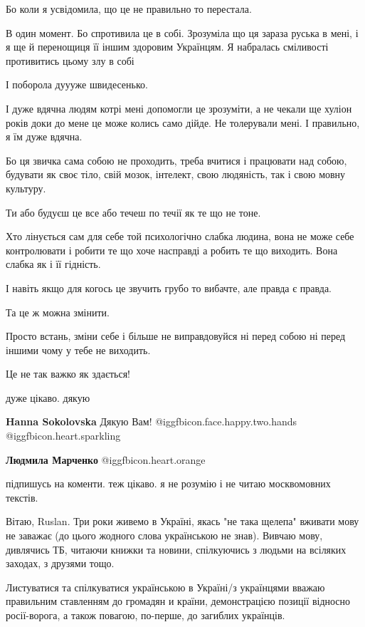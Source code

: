 \begin{itemize}
Бо коли я усвідомила, що це не правильно то перестала.

В один момент. Бо спротивила це в собі. Зрозуміла що ця зараза руська в мені, і
я ще й перенощиця її іншим здоровим Українцям. Я набралась сміливості
противитись цьому злу в собі

І поборола дуууже швидесенько.

І дуже вдячна людям котрі мені допомогли це зрозуміти, а не чекали ще хуліон
років доки до мене це може колись само дійде. Не толерували мені. І правильно,
я їм дуже вдячна.

Бо ця звичка сама собою не проходить, треба вчитися і працювати над собою,
будувати як своє тіло, свій мозок, інтелект, свою людяність, так і свою мовну
культуру.

Ти або будуєш це все або течеш по течії як те що не тоне.

Хто лінується сам для себе той психологічно слабка людина, вона не може себе
контролювати і робити те що хоче насправді а робить те що виходить. Вона слабка
як і її гідність.

І навіть якщо для когось це звучить грубо то вибачте, але правда є правда.

Та це ж можна змінити.

Просто встань, зміни себе і більше не виправдовуйся ні перед собою ні перед
іншими чому у тебе не виходить.

Це не так важко як здається!

\begin{itemize} %
дуже цікаво. дякую

\textbf{Hanna Sokolovska} Дякую Вам! @igg{fbicon.face.happy.two.hands}  @igg{fbicon.heart.sparkling} 

\textbf{Людмила Марченко}  @igg{fbicon.heart.orange} 
\end{itemize} %

підпишусь на коменти. теж цікаво. я не розумію і не читаю москвомовних текстів.


Вітаю, Ruslan. Три роки живемо в Україні, якась "не така щелепа" вживати мову
не заважає (до цього жодного слова українською не знав). Вивчаю мову, дивлячись
ТБ, читаючи книжки та новини, спілкуючись з людьми на всіляких заходах, з
друзями тощо.

Листуватися та спілкуватися українською в Україні/з українцями вважаю
правильним ставленням до громадян и країни, демонстрацією позиції відносно
росії-ворога, а також повагою, по-перше, до загиблих українців.


\end{itemize}

